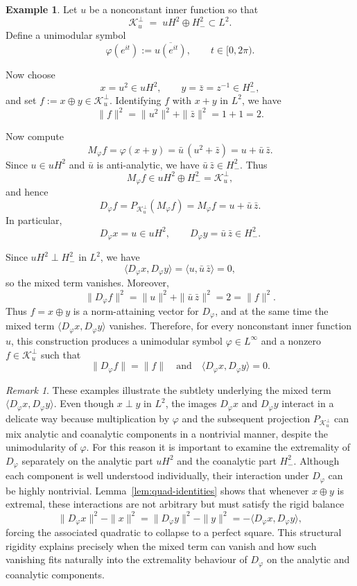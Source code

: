 \documentclass[12pt]{amsart}
\theoremstyle{definition}
\newtheorem{example}[theorem]{Example}
\theoremstyle{remark}
\newtheorem{remark}[theorem]{Remark}
\newcommand{\clk}{\mathcal{K}}
\newcommand{\vp}{\varphi}
\numberwithin{equation}{section}
\begin{document}
\begin{example}
Let $u$ be a nonconstant inner function so that
\[
\clk_u^\perp \;=\; uH^2 \oplus H^2_{-} \subset L^2.
\]
Define a unimodular symbol
\[
\vp(e^{it}) := \overline{u(e^{it})}, \qquad t\in [0,2\pi).
\]
	
Now choose
\[
x = u^2 \in uH^2, \qquad y= \bar{z} = z^{-1} \in H^2_{-},
\]
and set $f := x \oplus y \in \clk_u^\perp$. Identifying $f$ with $x+y$ in $L^2$, we have
\[
\|f\|^2 = \|u^2\|^2 + \|\bar{z}\|^2 = 1 + 1 = 2.
\]
	
Now compute
\[
M_\vp f = \vp(x+y) = \bar{u}\,(u^2 + \bar{z})= u + \bar{u}\,\bar{z}.
\]
Since $u \in uH^2$ and $\bar{u}$ is anti-analytic, we have $\bar{u}\,\bar{z} \in H^2_{-}$. Thus
\[
M_\vp f \in uH^2 \oplus H^2_{-} = \clk_u^\perp,
\]
and hence
\[
D_\vp f = P_{\clk_u^\perp}(M_\vp f) = M_\vp f = u + \bar{u}\,\bar{z}.
\]
In particular,
\[
D_\vp x = u \in uH^2, \qquad D_\vp y = \bar{u}\,\bar{z} \in H^2_{-}.
\]
	
Since $uH^2 \perp H^2_{-}$ in $L^2$, we have
\[
\langle D_\vp x, D_\vp y\rangle= \langle u, \bar{u}\,\bar{z}\rangle = 0,
\]
so the mixed term vanishes. Moreover,
\[
\|D_\vp f\|^2= \|u\|^2 + \|\bar{u}\,\bar{z}\|^2= 2 = \|f\|^2.
	\]
Thus $f=x\oplus y$ is a norm-attaining vector for $D_\vp$, and at the same time the mixed term $\langle D_\vp x, D_\vp y\rangle$ vanishes. Therefore, for every nonconstant inner function $u$, this construction produces a unimodular symbol $\vp\in L^\infty$ and a nonzero $f\in\clk_u^\perp$ such that
\[
\|D_\vp f\| = \|f\|\quad\text{and}\quad\langle D_\vp x, D_\vp y\rangle = 0.
\]
\end{example}







\begin{remark}
These examples illustrate the subtlety underlying the mixed term $\langle D_\vp x, D_\vp y\rangle$. Even though $x\perp y$ in $L^2$, the images $D_\vp x$ and $D_\vp y$ interact in a delicate way because multiplication by $\vp$ and the subsequent projection $P_{\clk_u^\perp}$ can mix analytic and coanalytic components in a nontrivial manner, despite the unimodularity of $\vp$. For this reason it is important to examine the extremality of $D_\vp$ separately on the analytic part $uH^2$ and the coanalytic part $H^2_{-}$. Although each component is well understood individually, their interaction under $D_\vp$ can be highly nontrivial. Lemma~\ref{lem:quad-identities} shows that whenever $x\oplus y$ is extremal, these interactions are not arbitrary but must satisfy the rigid balance
\[
\|D_\vp x\|^2-\|x\|^2=\|D_\vp y\|^2-\|y\|^2=-\langle D_\vp x, D_\vp y\rangle,
\]
forcing the associated quadratic to collapse to a perfect square. This structural rigidity explains precisely when the mixed term can vanish and how such vanishing fits naturally into the extremality behaviour of $D_\vp$ on the analytic and coanalytic components.
\end{remark}
\end{document}
